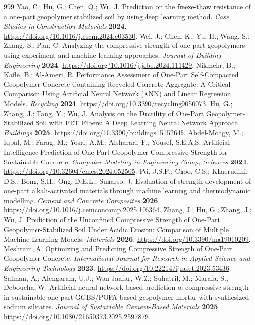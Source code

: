 \documentclass[materials,article,submit,pdftex,moreauthors]{Definitions/mdpi}
\begin{document}
\begin{thebibliography}{999}
Yao, C.; Hu, G.; Chen, Q.; Wu, J. Prediction on the freeze-thaw resistance of a one-part geopolymer stabilized soil by using deep learning method. {\em Case Studies in Construction Materials} {\bf 2024}. \url{https://doi.org/10.1016/j.cscm.2024.e03530}.
Wei, J.; Chen, K.; Yu, H.; Wang, S.; Zhang, S.; Pan, C. Analyzing the compressive strength of one-part geopolymers using experiment and machine learning approaches. {\em Journal of Building Engineering} {\bf 2024}. \url{https://doi.org/10.1016/j.jobe.2024.111429}.
Nikmehr, B.; Kafle, B.; Al-Ameri, R. Performance Assessment of One-Part Self-Compacted Geopolymer Concrete Containing Recycled Concrete Aggregate: A Critical Comparison Using Artificial Neural Network (ANN) and Linear Regression Models. {\em Recycling} {\bf 2024}. \url{https://doi.org/10.3390/recycling9050073}.
Hu, G.; Zhang, J.; Tang, Y.; Wu, J. Analysis on the Ductility of One-Part Geopolymer-Stabilized Soil with PET Fibers: A Deep Learning Neural Network Approach. {\em Buildings} {\bf 2025}. \url{https://doi.org/10.3390/buildings15152645}.
Abdel-Mongy, M.; Iqbal, M.; Farag, M.; Yosri, A.M.; Alsharari, F.; Yousef, S.E.A.S. Artificial Intelligence Prediction of One-Part Geopolymer Compressive Strength for Sustainable Concrete. {\em Computer Modeling in Engineering \&amp; Sciences} {\bf 2024}. \url{https://doi.org/10.32604/cmes.2024.052505}.
Pei, J.S.F.; Choo, C.S.; Khaerudini, D.S.; Bong, S.H.; Ong, D.E.L.; Sunarso, J. Evaluation of strength development of one-part alkali-activated materials through machine learning and thermodynamic modelling. {\em Cement and Concrete Composites} {\bf 2026}. \url{https://doi.org/10.1016/j.cemconcomp.2025.106364}.
Zhang, J.; Hu, G.; Zhang, J.; Wu, J. Prediction of the Unconfined Compressive Strength of One-Part Geopolymer-Stabilized Soil Under Acidic Erosion: Comparison of Multiple Machine Learning Models. {\em Materials} {\bf 2026}. \url{https://doi.org/10.3390/ma19010209}.
Meshram, A. Optimizing and Predicting Compressive Strength of One-Part Geopolymer Concrete. {\em International Journal for Research in Applied Science and Engineering Technology} {\bf 2023}. \url{https://doi.org/10.22214/ijraset.2023.53436}.
Salman, A.; Alengaram, U.J.; Wan Jaafar, W.Z.; Suhatril, M.; Marafa, S.; Deboucha, W. Artificial neural network-based prediction of compressive strength in sustainable one-part GGBS/POFA-based geopolymer mortar with synthesized sodium silicates. {\em Journal of Sustainable Cement-Based Materials} {\bf 2025}. \url{https://doi.org/10.1080/21650373.2025.2597879}.

\end{thebibliography}
\end{document}
